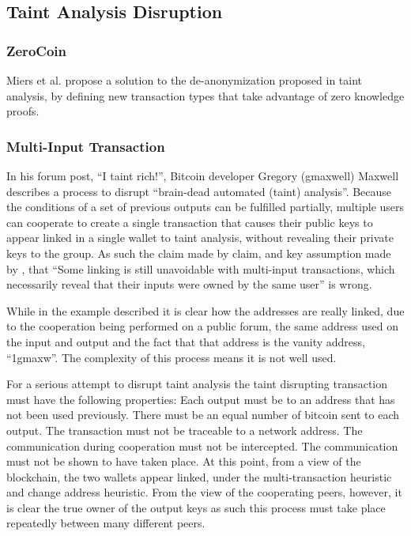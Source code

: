 \subsection{Taint Analysis Disruption}

\subsubsection{ZeroCoin} Miers et al.
propose a solution to the de-anonymization proposed in taint analysis, by
defining new transaction types that take advantage of zero knowledge
proofs\cite{zerocoin}.  \subsubsection{Multi-Input Transaction}

In his forum post, ``I taint rich!'', Bitcoin developer Gregory (gmaxwell)
Maxwell describes a process to disrupt ``brain-dead automated (taint)
analysis''.  Because the conditions of a set of previous outputs can be
fulfilled partially, multiple users can cooperate to create a single transaction
that causes their public keys to appear linked in a single wallet to taint
analysis, without revealing their private keys to the group.  As such the claim made by \textcite{satoshi}
claim, and key assumption made by \textcite{reid-anon}, that ``Some linking is
still unavoidable with multi-input transactions, which necessarily reveal that
their inputs were owned by the same user'' is wrong.

While in the example described it is clear how the addresses are really linked,
due to the cooperation being performed on a public forum, the same address used
on the input and output and the fact that that address is the vanity address,
``1gmaxw''. The complexity of this process means it is not well used.

For a serious attempt to disrupt taint analysis the taint disrupting transaction
must have the following properties:  Each output must be to an address that has
not been used previously. There must be an equal number of bitcoin sent to each
output. The transaction must not be traceable to a network address.  The
communication during cooperation must not be intercepted. The communication must
not be shown to have taken place.  At this point, from a view of the blockchain,
the two wallets appear linked, under the multi-transaction heuristic and change
address heuristic. From the view of the cooperating peers, however, it is clear
the true owner of the output keys as such this process must take place
repeatedly between many different peers.


